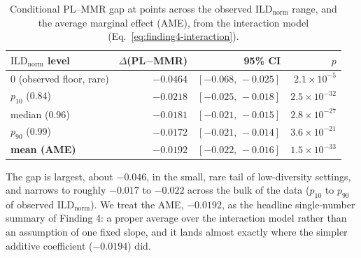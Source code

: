 \documentclass[11pt]{article}
\newcommand{\ild}{\ensuremath{\mathrm{ILD}}}
\newcommand{\ildnorm}{\ensuremath{\ild_{\mathrm{norm}}}}
\begin{document}
\begin{table}[htbp]
\centering
\caption{Conditional PL--MMR gap at points across the observed \ildnorm{}
range, and the average marginal effect (AME), from the interaction model
(Eq.~\ref{eq:finding4-interaction}).}
\label{tab:finding4-conditional}
\begin{tabular}{lrrr}
\toprule
\ildnorm{} level & $\Delta$(PL$-$MMR) & 95\% CI & $p$ \\
\midrule
0 (observed floor, rare) & $-0.0464$ & $[-0.068,\,-0.025]$ & $2.1\times10^{-5}$ \\
$p_{10}$ (0.84) & $-0.0218$ & $[-0.025,\,-0.018]$ & $2.5\times10^{-32}$ \\
median (0.96) & $-0.0181$ & $[-0.021,\,-0.015]$ & $2.8\times10^{-27}$ \\
$p_{90}$ (0.99) & $-0.0172$ & $[-0.021,\,-0.014]$ & $3.6\times10^{-21}$ \\
\textbf{mean (AME)} & \textbf{$-0.0192$} & \textbf{$[-0.022,\,-0.016]$} & \textbf{$1.5\times10^{-33}$} \\
\bottomrule
\end{tabular}
\end{table}

The gap is largest, about $-0.046$, in the small, rare tail of
low-diversity settings, and narrows to roughly $-0.017$ to $-0.022$ across
the bulk of the data ($p_{10}$ to $p_{90}$ of observed \ildnorm{}). We
treat the AME, $-0.0192$, as the headline single-number summary of
Finding 4: a proper average over the interaction model rather than an
assumption of one fixed slope, and it lands almost exactly where the
simpler additive coefficient ($-0.0194$) did.
\end{document}
